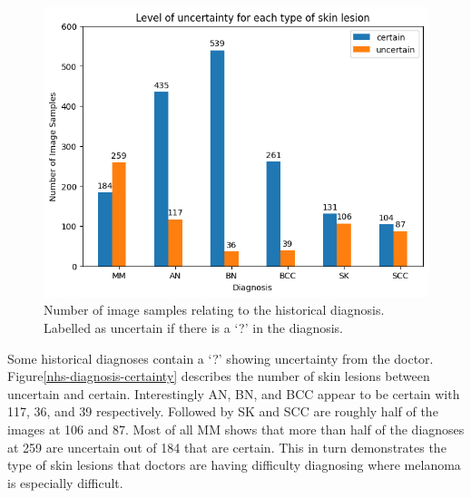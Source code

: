 \begin{figure}
	\centering
	\includegraphics[scale=0.75]{images/nhs/nhs-diagnosis-certainty.png}
	\caption{Number of image samples relating to the historical diagnosis. Labelled as uncertain if there is a `?' in the diagnosis.}
\end{figure}\label{nhs-diagnosis-certainty}

Some historical diagnoses contain a `?' showing uncertainty from the doctor. Figure\ref{nhs-diagnosis-certainty} describes the number of skin lesions between uncertain and certain. Interestingly AN, BN, and BCC appear to be certain with 117, 36, and 39 respectively. Followed by SK and SCC are roughly half of the images at 106 and 87. Most of all MM shows that more than half of the diagnoses at 259 are uncertain out of 184 that are certain. This in turn demonstrates the type of skin lesions that doctors are having difficulty diagnosing where melanoma is especially difficult.

